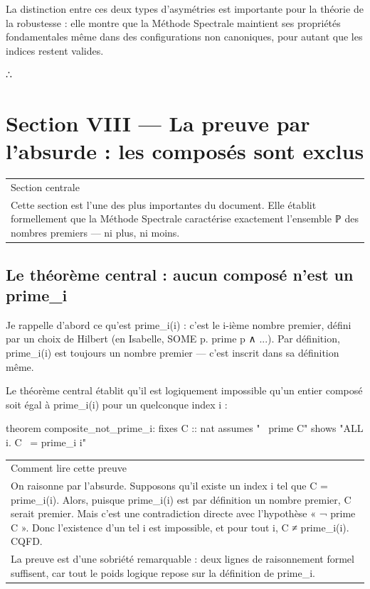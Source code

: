\documentclass[11pt,a4paper]{article}
\begin{document}
La distinction entre ces deux types d'asymétries est importante pour la théorie de la robustesse : elle montre que la Méthode Spectrale maintient ses propriétés fondamentales même dans des configurations non canoniques, pour autant que les indices restent valides.

∴

\section{Section VIII — La preuve par l'absurde : les composés sont exclus}

\begin{longtable}{|p{}|}
\hline
Section centrale \\ Cette section est l'une des plus importantes du document. Elle établit formellement que la Méthode Spectrale caractérise exactement l'ensemble ℙ des nombres premiers — ni plus, ni moins. \\
\hline
\end{longtable}


\subsection{Le théorème central : aucun composé n'est un prime\_i}

Je rappelle d'abord ce qu'est prime\_i(i) : c'est le i-ième nombre premier, défini par un choix de Hilbert (en Isabelle, SOME p. prime p ∧ ...). Par définition, prime\_i(i) est toujours un nombre premier — c'est inscrit dans sa définition même.

Le théorème central établit qu'il est logiquement impossible qu'un entier composé soit égal à prime\_i(i) pour un quelconque index i :

\begin{holcode}[title={Code HOL — Théorème central d'exclusion des composés}]
theorem composite_not_prime_i:
 fixes C :: nat
 assumes "~ prime C"
 shows "ALL i. C ~= prime_i i"
\end{holcode}


\begin{longtable}{|p{}|}
\hline
Comment lire cette preuve \\ On raisonne par l'absurde. Supposons qu'il existe un index i tel que C = prime\_i(i). Alors, puisque prime\_i(i) est par définition un nombre premier, C serait premier. Mais c'est une contradiction directe avec l'hypothèse « ¬ prime C ». Donc l'existence d'un tel i est impossible, et pour tout i, C ≠ prime\_i(i). CQFD. \\ La preuve est d'une sobriété remarquable : deux lignes de raisonnement formel suffisent, car tout le poids logique repose sur la définition de prime\_i. \\
\hline
\end{longtable}
\end{document}
